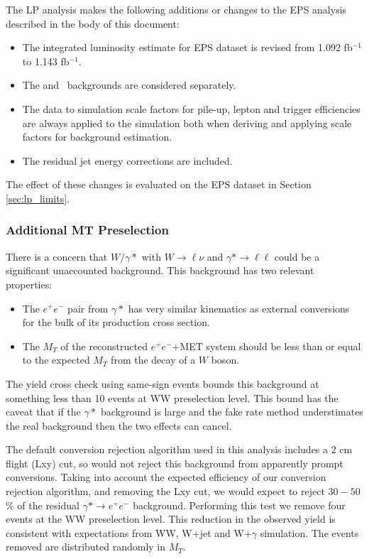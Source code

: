 
The LP analysis makes the following additions or changes to the EPS analysis
described in the body of this document:

\begin{itemize}
    \item The integrated luminosity estimate for EPS dataset is revised from 1.092 fb$^{-1}$ to 1.143 fb$^{-1}$.
    \item The \dytt and \dyll~backgrounds are considered separately.
    \item The data to simulation scale factors for pile-up, lepton and trigger efficiencies are 
always applied to the simulation both when deriving and applying scale factors for background estimation.
    \item The residual jet energy corrections are included.
\end{itemize}

The effect of these changes is evaluated on the EPS dataset in Section \ref{sec:lp_limits}.

\subsubsection{Additional MT Preselection}

There is a concern that $W/\gamma*$ with $W\rightarrow \ell\nu$ 
and $\gamma*\rightarrow\ell\ell$ could be a significant unaccounted background.
This background has two relevant properties:

\begin{itemize}
    \item The $e^{+}e^{-}$ pair from $\gamma*$ has very similar kinematics as external
   conversions for the bulk of its production cross section.
    \item The $M_T$ of the reconstructed $e^{+}e^{-}$+MET system should be less than
    or equal to the expected $M_T$ from the decay of a $W$ boson.
\end{itemize}

The yield cross check using same-sign events bounds this background 
at something less than 10 events at WW preselection level.  
This bound has the caveat that if the $\gamma*$ background is large and the 
fake rate method understimates the real background then the two
effects can cancel.

The default conversion rejection algorithm used in this analysis
includes a 2 cm flight (Lxy) cut, so would not reject this background
from apparently prompt conversions.
Taking into account the expected efficiency of our conversion
rejection algorithm, and removing the Lxy cut, 
we would expect to reject $30-50$\% of the residual 
$\gamma*\rightarrow e^{+}e^{-}$ background.
Performing this test we remove four events at the WW preselection level.
This reduction in the observed yield is consistent with expectations
from WW, W+jet and W+$\gamma$ simulation.
The events removed are distributed randomly in $M_T$.

